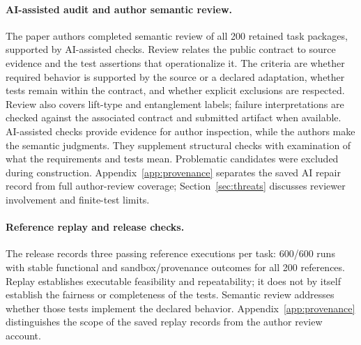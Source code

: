 \documentclass[acmsmall,screen,review,anonymous,nonacm]{acmart}
\begin{document}
\paragraph{AI-assisted audit and author semantic review.}
The paper authors completed semantic review of all 200 retained task packages,
supported by AI-assisted checks. Review relates the public contract to source
evidence and the test assertions that operationalize it. The criteria are
whether required behavior is supported by the source or a declared adaptation,
whether tests remain within the contract, and whether explicit exclusions are
respected. Review also covers lift-type and entanglement labels; failure
interpretations are checked against the associated contract and submitted
artifact when available. AI-assisted checks provide evidence for author
inspection, while the authors make the semantic judgments. They supplement
structural checks with examination of what the requirements and tests mean.
Problematic candidates were excluded during construction. Appendix~\ref{app:provenance}
separates the saved AI repair record from full author-review coverage;
Section~\ref{sec:threats} discusses reviewer involvement and finite-test limits.

\paragraph{Reference replay and release checks.}
The release records three passing reference executions per task: 600/600 runs
with stable functional and sandbox/provenance outcomes for all 200 references.
Replay establishes executable feasibility and repeatability; it does not by
itself establish the fairness or completeness of the tests. Semantic review
addresses whether those tests implement the declared behavior.
Appendix~\ref{app:provenance} distinguishes the scope of the
saved replay records from the author review account.
\end{document}
